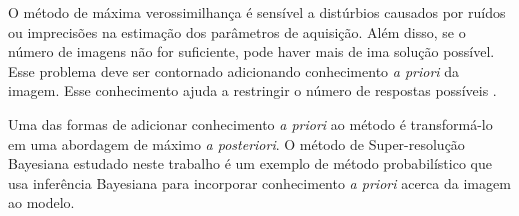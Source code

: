 O método de máxima verossimilhança é sensível a distúrbios causados por ruídos ou
imprecisões na estimação dos parâmetros de aquisição.
Além disso, se o número de imagens não for suficiente, pode haver mais de ima solução
possível. Esse problema deve ser contornado adicionando conhecimento \emph{a priori} da
imagem.
Esse conhecimento ajuda a restringir o número de respostas possíveis \cite{nasrollahi2014super}.

Uma das formas de adicionar conhecimento \emph{a priori} ao método é transformá-lo em
uma abordagem de máximo \emph{a posteriori}.
O método de Super-resolução Bayesiana estudado neste trabalho é um exemplo de método probabilístico que usa inferência Bayesiana para incorporar conhecimento \emph{a priori} acerca da imagem ao modelo.

